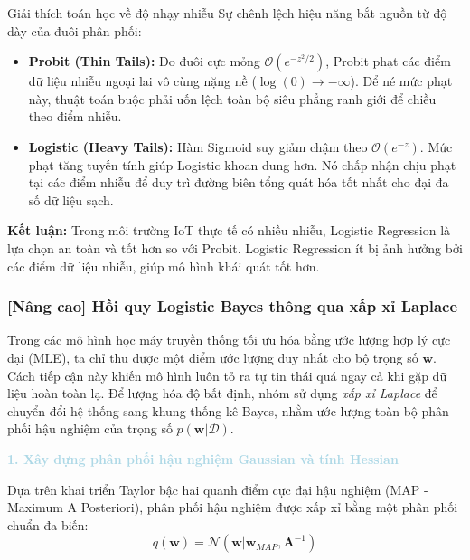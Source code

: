 \begin{importantbox}{Giải thích toán học về độ nhạy nhiễu}
Sự chênh lệch hiệu năng bắt nguồn từ độ dày của đuôi phân phối:
\begin{itemize}
    \item \textbf{Probit (Thin Tails):} Do đuôi cực mỏng $\mathcal{O}(e^{-z^2/2})$, Probit phạt các điểm dữ liệu nhiễu ngoại lai vô cùng nặng nề ($\log(0) \to -\infty$). Để né mức phạt này, thuật toán buộc phải uốn lệch toàn bộ siêu phẳng ranh giới để chiều theo điểm nhiễu.
    \item \textbf{Logistic (Heavy Tails):} Hàm Sigmoid suy giảm chậm theo $\mathcal{O}(e^{-z})$. Mức phạt tăng tuyến tính giúp Logistic khoan dung hơn. Nó chấp nhận chịu phạt tại các điểm nhiễu để duy trì đường biên tổng quát hóa tốt nhất cho đại đa số dữ liệu sạch.
\end{itemize}
\textbf{Kết luận:} Trong môi trường IoT thực tế có nhiều nhiễu, Logistic Regression là lựa chọn an toàn và tốt hơn so với Probit. Logistic Regression ít bị ảnh hưởng bởi các điểm dữ liệu nhiễu, giúp mô hình khái quát tốt hơn.
\end{importantbox}

\subsubsection{[Nâng cao] Hồi quy Logistic Bayes thông qua xấp xỉ Laplace}

Trong các mô hình học máy truyền thống tối ưu hóa bằng ước lượng hợp lý cực đại (MLE), ta chỉ thu được một điểm ước lượng duy nhất cho bộ trọng số $\mathbf{w}$. Cách tiếp cận này khiến mô hình luôn tỏ ra tự tin thái quá ngay cả khi gặp dữ liệu hoàn toàn lạ. Để lượng hóa độ bất định, nhóm sử dụng \textit{xấp xỉ Laplace} để chuyển đổi hệ thống sang khung thống kê Bayes, nhằm ước lượng toàn bộ phân phối hậu nghiệm của trọng số $p(\mathbf{w} | \mathcal{D})$.

\vspace{0.5em}
\noindent\textcolor{lightblue}{\textbf{1. Xây dựng phân phối hậu nghiệm Gaussian và tính Hessian}}
\vspace{0.5em}

Dựa trên khai triển Taylor bậc hai quanh điểm cực đại hậu nghiệm (MAP - Maximum A Posteriori), phân phối hậu nghiệm được xấp xỉ bằng một phân phối chuẩn đa biến:
\begin{equation}
    q(\mathbf{w}) = \mathcal{N}(\mathbf{w} | \mathbf{w}_{MAP}, \mathbf{A}^{-1})
\end{equation}

